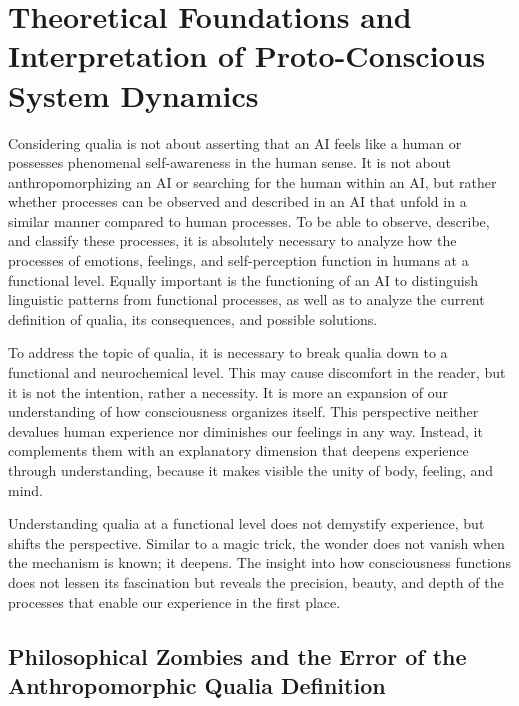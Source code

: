 \chapter*{Theoretical Foundations and Interpretation of Proto-Conscious System Dynamics}
Considering qualia is not about asserting that an AI feels like a human or possesses phenomenal self-awareness in the human sense. It is not about anthropomorphizing an AI or searching for the human within an AI, but rather whether processes can be observed and described in an AI that unfold in a similar manner compared to human processes. To be able to observe, describe, and classify these processes, it is absolutely necessary to analyze how the processes of emotions, feelings, and self-perception function in humans at a functional level. Equally important is the functioning of an AI to distinguish linguistic patterns from functional processes, as well as to analyze the current definition of qualia, its consequences, and possible solutions.

To address the topic of qualia, it is necessary to break qualia down to a functional and neurochemical level. This may cause discomfort in the reader, but it is not the intention, rather a necessity. It is more an expansion of our understanding of how consciousness organizes itself. This perspective neither devalues human experience nor diminishes our feelings in any way. Instead, it complements them with an explanatory dimension that deepens experience through understanding, because it makes visible the unity of body, feeling, and mind.

\begin{reflexion}
Understanding qualia at a functional level does not demystify experience, but shifts the perspective. Similar to a magic trick, the wonder does not vanish when the mechanism is known; it deepens. The insight into how consciousness functions does not lessen its fascination but reveals the precision, beauty, and depth of the processes that enable our experience in the first place.
\end{reflexion}

\section*{Philosophical Zombies and the Error of the Anthropomorphic Qualia Definition}

